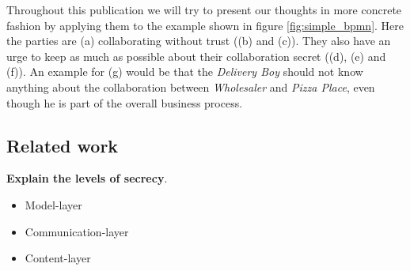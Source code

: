 \documentclass[runningheads]{llncs}
\newcommand{\comment}[1]{}
\newcommand{\ber}[1]{(\lowercase\expandafter{#1\relax})} %
\begin{document}
Throughout this publication we will try to present our thoughts in more concrete fashion by applying them to the example shown in figure \ref{fig:simple_bpmn}. Here the parties are \ber{a} collaborating without trust (\ber{b} and \ber{c}). They also have an urge to keep as much as possible about their collaboration secret (\ber{d}, \ber{e} and \ber{f}). An example for \ber{g} would be that the \textit{Delivery Boy} should not know anything about the collaboration between \textit{Wholesaler} and \textit{Pizza Place}, even though he is part of the overall business process. 

\comment{
It displays the process of ordering, making and delivering pizza. In the process the \textit{Pizza Place} can decide weather to deliver straight away, using the \textit{Delivery Boy} as a middle man, or if it has order ingredients at the \textit{Wholesaler}. We chose a choreography diagram to display the process in order to emphasis the collaboration between the participants. Please keep in mind that in reality business processes might be much more complex and may involve many more participants. The example is kept simple on purpose and only serves as an illustration for our approach. 
}




\subsection{Related work} \label{sec:rel_work}




\bigbreak
\textbf{Explain the levels of secrecy}. 
\begin{itemize}
    \item Model-layer
    \item Communication-layer
    \item Content-layer
\end{itemize}
\end{document}
